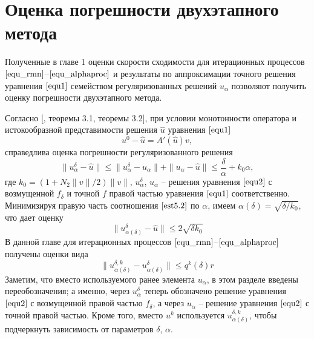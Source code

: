 \newpage
\section{Оценка погрешности двухэтапного метода}

Полученные в главе 1 оценки скорости сходимости для итерационных процессов $\eqref{equ_rmn}$--$\eqref{equ_alphaproc}$ и результаты по аппроксимации точного решения уравнения $\eqref{equ1}$ семейством регуляризованных решений $u_\alpha$ позволяют получить оценку погрешности двухэтапного метода.

Согласно [\cite{Tau2002}, теоремы 3.1, теоремы 3.2], при условии монотонности оператора и истокообразной представимости решения $\hat{u}$ уравнения $\eqref{equ1}$
\begin{equation}\label{cond5.1}
u^0-\hat{u}=A'(\hat{u})v,
\end{equation}
справедлива оценка погрешности регуляризованного решения
\begin{equation}\label{est5.2}
\|u_\alpha^{\delta}-\hat{u}\|\le\|u_\alpha^{\delta}-u_\alpha\|+\|u_\alpha-\hat{u}\|\le\frac{\delta}{\alpha}+k_0\alpha,
\end{equation}
где $k_0=(1+N_2\|v\|/2)\|v\|$, $u_\alpha^{\delta}$, $u_\alpha$ -- решения уравнения $\eqref{equ2}$ с возмущенной $f_\delta$ и точной $f$ правой частью уравнения $\eqref{equ1}$ соответственно. Минимизируя правую часть соотношения $\eqref{est5.2}$ по $\alpha$, имеем $\alpha(\delta)=\sqrt{\delta /k_0}$, что дает оценку
\begin{equation}\label{est5.3}
\|u_{\alpha(\delta)}^{\delta}-\hat{u}\|\le 2\sqrt{\delta k_0}
\end{equation}
В данной главе для итерационных процессов $\eqref{equ_rmn}$--$\eqref{equ_alphaproc}$ получены оценки вида 
\begin{equation}\label{est5.4}
\|u_{\alpha(\delta)}^{\delta, k}-u_{\alpha(\delta)}^{\delta}\|\le q^k(\delta)r
\end{equation}
Заметим, что вместо используемого ранее элемента $u_\alpha$, в этом разделе введены переобозначения; а именно, через $u_\alpha^{\delta}$ теперь обозначено решение уравнения $\eqref{equ2}$ с возмущенной правой частью $f_\delta$, а через $u_\alpha$ -- решение уравнения $\eqref{equ2}$ с точной правой частью. Кроме того, вместо $u^k$ используется $u_{\alpha(\delta)}^{\delta, k}$, чтобы подчеркнуть зависимость от параметров $\delta$, $\alpha$.

